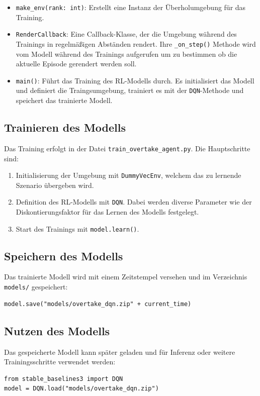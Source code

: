 \begin{itemize}
    \item \texttt{make\_env(rank: int)}: Erstellt eine Instanz der Überholumgebung für das Training.
    \item \texttt{RenderCallback}: Eine Callback-Klasse, der die Umgebung während des Trainings in regelmäßigen Abständen rendert. Ihre \texttt{\_on\_step()} Methode wird vom Modell während des Trainings aufgerufen um zu bestimmen ob die aktuelle Episode gerendert werden soll.
    \item \texttt{main()}: Führt das Training des RL-Modells durch. Es initialisiert das Modell und definiert die Traingsumgebung, trainiert es mit der \texttt{DQN}-Methode und speichert das trainierte Modell.
\end{itemize}

\subsection{Trainieren des Modells}
Das Training erfolgt in der Datei \texttt{train\_overtake\_agent.py}. Die Hauptschritte sind:
\begin{enumerate}
    \item Initialisierung der Umgebung mit \texttt{DummyVecEnv}, welchem das zu lernende Szenario übergeben wird.
    \item Definition des RL-Modells mit \texttt{DQN}. Dabei werden diverse Parameter wie der Diskontierungsfaktor für das Lernen des Modells festgelegt.
    \item Start des Trainings mit \texttt{model.learn()}.
\end{enumerate}

\subsection{Speichern des Modells}
Das trainierte Modell wird mit einem Zeitstempel versehen und im Verzeichnis \texttt{models/} gespeichert:
\begin{lstlisting}
model.save("models/overtake_dqn.zip" + current_time)
\end{lstlisting}

\subsection{Nutzen des Modells}
Das gespeicherte Modell kann später geladen und für Inferenz oder weitere Trainingsschritte verwendet werden:
\begin{lstlisting}
from stable_baselines3 import DQN
model = DQN.load("models/overtake_dqn.zip")
\end{lstlisting}